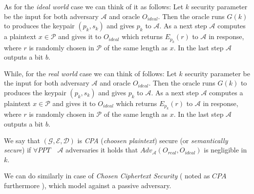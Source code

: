 \documentclass[10pt,a4paper]{article}
\begin{document}
As for the \textit{ideal world} case we can think of it as follows: 
    Let $k$ security parameter  be the input for both adversary $\mathcal{A}$ and oracle $O_{ideal}$. Then the oracle runs $G(k)$ to produces the keypair $(p_k, s_k)$ and gives $p_k$ to $\mathcal{A}$. 
    As a next step $\mathcal{A}$ computes a plaintext $x \in \mathcal{P}$ and gives it to $O_{ideal}$ which returns $E_{p_k}(r)$ to $\mathcal{A}$ in response, where $r$ is randomly chosen in $\mathcal{P}$ of the same length as $x$.  In the last step $\mathcal{A}$ outputs a bit $b$.\cite{Damgaard2025}

While, for the \textit{real world} case we can think of follows: 
Let $k$ security parameter  be the input for both adversary $\mathcal{A}$ and oracle $O_{ideal}$. Then the oracle runs $G(k)$ to produces the keypair $(p_k, s_k)$ and gives $p_k$ to $\mathcal{A}$. 
    As a next step $\mathcal{A}$ computes a plaintext $x \in \mathcal{P}$ and gives it to $O_{ideal}$ which returns $E_{p_k}(r)$ to $\mathcal{A}$ in response, where $r$ is randomly chosen in $\mathcal{P}$ of the same length as $x$. In the last step $\mathcal{A}$ outputs a bit $b$.\cite{Damgaard2025}



% 
 We say that $(\mathcal{G}, \mathcal{E}, \mathcal{D})$ is \textit{CPA} (\textit{choosen plaintext}) secure (or \textit{semantically secure}) if $\forall PPT\quad \mathcal{A}$ adversaries it holds that $Adv_{\mathcal{A}} \left( O_{real}, O_{ideal}\right)$ is negligible in $k$.\cite{Damgaard2025}

We can do similarly in case of \textit{Chosen Ciphertext Security} ( noted as $CPA$ furthermore ), which model against a passive adversary. \cite{Damgaard2025}
\end{document}
